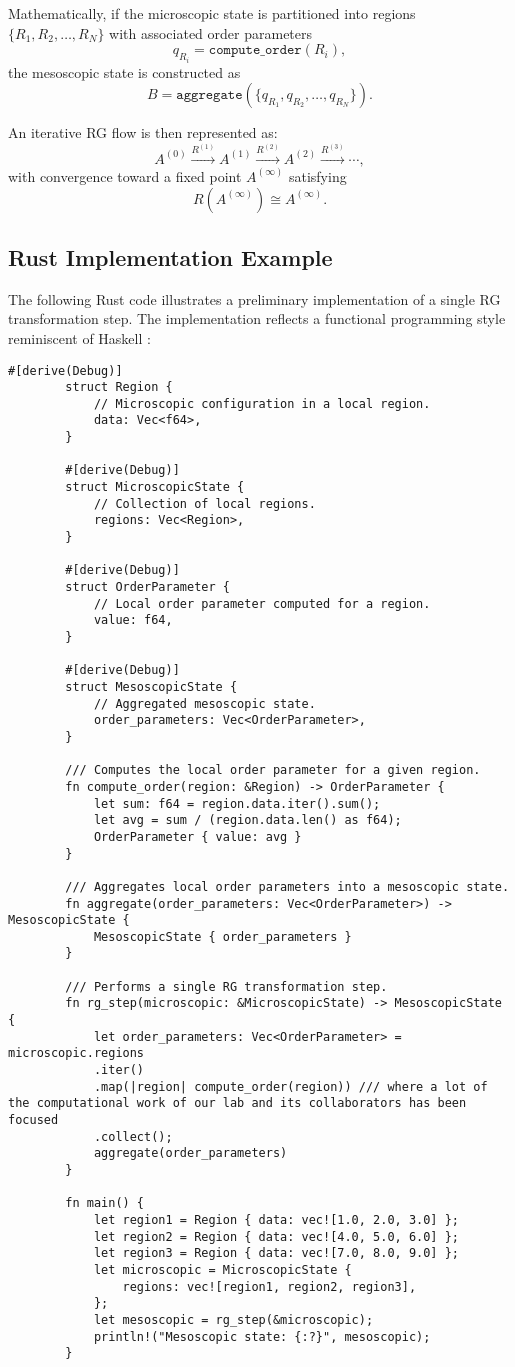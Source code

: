 	Mathematically, if the microscopic state is partitioned into regions \( \{ R_1, R_2, \dots, R_N \} \) with associated order parameters
	\[
	q_{R_i} = \texttt{compute\_order}(R_i),
	\]
	the mesoscopic state is constructed as
	\[
	B = \texttt{aggregate}(\{q_{R_1}, q_{R_2}, \dots, q_{R_N}\}).
	\]
	
	An iterative RG flow is then represented as:
	\[
	A^{(0)} \xrightarrow{R^{(1)}} A^{(1)} \xrightarrow{R^{(2)}} A^{(2)} \xrightarrow{R^{(3)}} \cdots,
	\]
	with convergence toward a fixed point \(A^{(\infty)}\) satisfying
	\[
	R(A^{(\infty)}) \cong A^{(\infty)}.
	\]
	
	\subsection{Rust Implementation Example}
	
	The following Rust code illustrates a preliminary implementation of a single RG transformation step. The implementation reflects a functional programming style reminiscent of Haskell \cite{hudak1989conception}:
	
	\begin{lstlisting}[caption={Rust Implementation of a Single RG Transformation Step}]
		#[derive(Debug)]
		struct Region {
			// Microscopic configuration in a local region.
			data: Vec<f64>,
		}
		
		#[derive(Debug)]
		struct MicroscopicState {
			// Collection of local regions.
			regions: Vec<Region>,
		}
		
		#[derive(Debug)]
		struct OrderParameter {
			// Local order parameter computed for a region.
			value: f64,
		}
		
		#[derive(Debug)]
		struct MesoscopicState {
			// Aggregated mesoscopic state.
			order_parameters: Vec<OrderParameter>,
		}
		
		/// Computes the local order parameter for a given region.
		fn compute_order(region: &Region) -> OrderParameter {
			let sum: f64 = region.data.iter().sum();
			let avg = sum / (region.data.len() as f64);
			OrderParameter { value: avg }
		}
		
		/// Aggregates local order parameters into a mesoscopic state.
		fn aggregate(order_parameters: Vec<OrderParameter>) -> MesoscopicState {
			MesoscopicState { order_parameters }
		}
		
		/// Performs a single RG transformation step.
		fn rg_step(microscopic: &MicroscopicState) -> MesoscopicState {
			let order_parameters: Vec<OrderParameter> = microscopic.regions
			.iter()
			.map(|region| compute_order(region)) /// where a lot of the computational work of our lab and its collaborators has been focused
			.collect();
			aggregate(order_parameters)
		}
		
		fn main() {
			let region1 = Region { data: vec![1.0, 2.0, 3.0] };
			let region2 = Region { data: vec![4.0, 5.0, 6.0] };
			let region3 = Region { data: vec![7.0, 8.0, 9.0] };
			let microscopic = MicroscopicState {
				regions: vec![region1, region2, region3],
			};
			let mesoscopic = rg_step(&microscopic);
			println!("Mesoscopic state: {:?}", mesoscopic);
		}
	\end{lstlisting}
	
